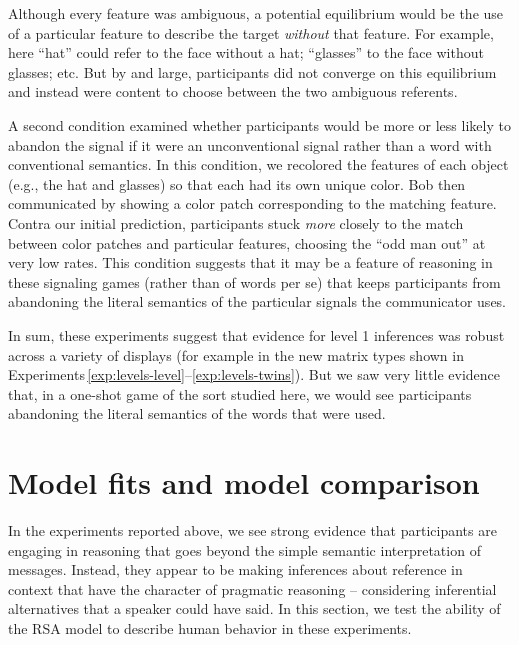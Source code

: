\documentclass[man,noapacite]{apa2}
\newcounter{Experiment}
\newcommand{\exptrefrange}[2]{Experiments\,\ref{#1}--\ref{#2}}
\begin{document}
\noindent Although every feature was ambiguous, a potential equilibrium would be the use of a particular feature to describe the target \emph{without} that feature. For example, here ``hat'' could refer to the face without a hat; ``glasses'' to the face without glasses; etc. But by and large, participants did not converge on this equilibrium and instead were content to choose between the two ambiguous referents.

A second condition examined whether participants would be more or less likely to abandon the signal if it were an unconventional signal rather than a word with conventional semantics. In this condition, we recolored the features of each object (e.g., the hat and glasses) so that each had its own unique color. Bob then communicated by showing a color patch corresponding to the matching feature. Contra our initial prediction, participants stuck \emph{more} closely to the match between color patches and particular features, choosing the ``odd man out'' at very low rates. This condition suggests that it may be a feature of reasoning in these signaling games (rather than of words per se) that keeps participants from abandoning the literal semantics of the particular signals the communicator uses.

In sum, these experiments suggest that evidence for level 1 inferences was robust across a variety of displays (for example in the new matrix types shown in \exptrefrange{exp:levels-level}{exp:levels-twins}). But we saw very little evidence that, in a one-shot game of the sort studied here, we would see participants abandoning the literal semantics of the words that were used.


% 

% 

% 

\section{Model fits and model comparison}
\label{sec:modelcomp}

In the experiments reported above, we see strong evidence that participants are engaging in reasoning that goes beyond the simple semantic interpretation of messages. Instead, they appear to be making inferences about reference in context that have the character of pragmatic reasoning -- considering inferential alternatives that a speaker could have said. In this section, we test the ability of the RSA model to describe human behavior in these experiments.
\end{document}
